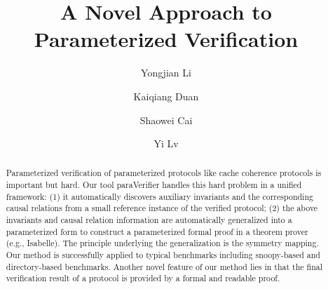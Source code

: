 \documentclass[final]{IEEEtran}
\begin{document}
\title{ {\sf A Novel Approach to Parameterized Verification}
}
\author{Yongjian Li  \and
        Kaiqiang Duan  \and
        Shaowei Cai  \and
        Yi Lv
}
\maketitle
\begin{abstract}
Parameterized verification of parameterized protocols like cache coherence protocols is important
but hard.   Our tool {\sf paraVerifier} handles this hard problem in
a unified framework: (1) it automatically  discovers auxiliary invariants and the
corresponding causal relations %
 from a small reference instance of the verified protocol; (2) the above
invariants and causal relation information  are automatically generalized into a parameterized
form to construct a parameterized formal proof in a theorem prover
(e.g., Isabelle). The principle underlying the generalization is the
symmetry mapping. Our method is successfully applied to typical
benchmarks including  snoopy-based and directory-based benchmarks. Another novel
feature of our method lies in that the final verification result of a
protocol is provided by a formal and readable proof.%

\end{abstract}

\end{document}
